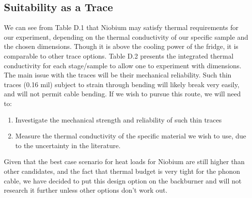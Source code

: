 \documentclass{report}
\begin{document}
\begin{appendices}
\section{Suitability as a Trace}
We can see from Table D.1 that Niobium may satisfy thermal requirements for our experiment, depending on the thermal conductivity of our specific sample and the chosen dimensions. Though it is above the cooling power of the fridge, it is comparable to other trace options. Table D.2 presents the integrated thermal conductivity for each stage/sample to allow one to experiment with dimensions. The main issue with the traces will be their mechanical reliability. Such thin traces (0.16 mil) subject to strain through bending will likely break very easily, and will not permit cable bending. If we wish to pursue this route, we will need to:
\begin{enumerate}
\item Investigate the mechanical strength and reliability of such thin traces
\item Measure the thermal conductivity of the specific material we wish to use, due to the uncertainty in the literature.
\end{enumerate}

Given that the best case scenario for heat loads for Niobium are still higher than other candidates, and the fact that thermal budget is very tight for the phonon cable, we have decided to put this design option on the backburner and will not research it further unless other options don't work out.

\end{appendices}

\newpage

\end{document}
